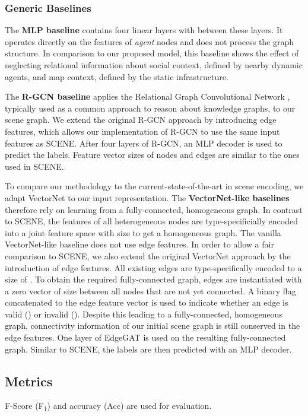 \documentclass[letterpaper, 10 pt, journal, twoside]{IEEEtran}
\begin{document}
\subsubsection{Generic Baselines}
The \textbf{MLP baseline} contains four linear layers with  between these layers.
It operates directly on the features of \textit{agent} nodes and does not process the graph structure.
In comparison to our proposed model, this baseline shows the effect of neglecting relational information about social context, defined by nearby dynamic agents, and map context, defined by the static infrastructure.

The \textbf{R-GCN baseline} applies the Relational Graph Convolutional Network \cite{Schlichtkrull2018}, typically used as a common approach to reason about knowledge graphs, to our scene graph.
We extend the original R-GCN approach by introducing edge features, which allows our implementation of R-GCN to use the same input features as SCENE.
After four layers of R-GCN, an MLP decoder is used to predict the labels.
Feature vector sizes of nodes and edges are similar to the ones used in SCENE.

To compare our methodology to the current-state-of-the-art in scene encoding, we adapt VectorNet \cite{Gao2020} to our input representation.
The \textbf{VectorNet-like baselines} therefore rely on learning from a fully-connected, homogeneous graph.
In contrast to SCENE, the features of all heterogeneous nodes are type-specificially encoded into a joint feature space with size  to get a homogeneous graph.
The vanilla VectorNet-like baseline does not use edge features.
In order to allow a fair comparison to SCENE, we also extend the original VectorNet approach by the introduction of edge features.
All existing edges are type-specifically encoded to a size of .
To obtain the required fully-connected graph, edges are instantiated with a zero vector of size  between all nodes that are not yet connected.
A binary flag concatenated to the edge feature vector is used to indicate whether an edge is valid () or invalid ().
Despite this leading to a fully-connected, homogeneous graph, connectivity information of our initial scene graph is still conserved in the edge features.
One layer of EdgeGAT is used on the resulting fully-connected graph.
Similar to SCENE, the labels are then predicted with an MLP decoder.

\subsection{Metrics}
F-Score (F\textsubscript{1}) and accuracy (Acc) are used for evaluation.
\end{document}
